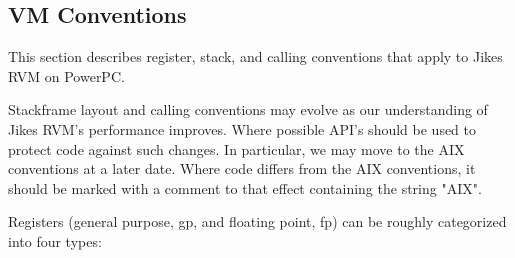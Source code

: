\JikesTMFooter

\subsection{VM Conventions}

\label{aix-conventions}


This section describes register, stack, and calling conventions that apply to 
Jikes RVM on PowerPC\PowerPCTMFootnote.

Stackframe layout and calling conventions may evolve as our understanding
of Jikes RVM's performance improves.  Where possible API's should be used
to protect code against such changes.  In particular, we may move to
the AIX conventions at a later date.  Where code differs from the AIX
conventions, it should be marked with a comment to that effect containing
the string "AIX".


Registers (general purpose, gp, and floating point, fp) can be roughly
categorized into four types:

